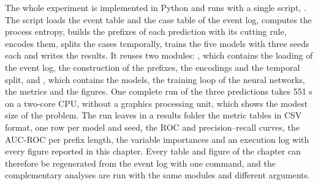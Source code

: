 The whole experiment is implemented in Python and runs with a single script, . The script loads the event table and the case table of the event log, computes the process entropy, builds the prefixes of each prediction with its cutting rule, encodes them, splits the cases temporally, trains the five models with three seeds each and writes the results. It reuses two modules: , which contains the loading of the event log, the construction of the prefixes, the encodings and the temporal split, and , which contains the models, the training loop of the neural networks, the metrics and the figures. One complete run of the three predictions takes 551 s on a two-core CPU, without a graphics processing unit, which shows the modest size of the problem. The run leaves in a results folder the metric tables in CSV format, one row per model and seed, the ROC and precision--recall curves, the AUC-ROC per prefix length, the variable importances and an execution log with every figure reported in this chapter. Every table and figure of the chapter can therefore be regenerated from the event log with one command, and the complementary analyses are run with the same modules and different arguments.

